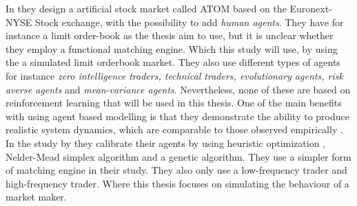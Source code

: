 \documentclass{kththesis}
\theoremstyle{definition}
\begin{document}
\newline
In \textcite{brandouy2011design} they design a artificial stock market called ATOM based on the Euronext-NYSE Stock exchange, with the possibility to add \textit{human agents}. They have for instance a limit order-book as the thesis aim to use, but it is unclear whether they employ a functional matching engine. Which this study will use, by using the a simulated limit orderbook market. They also use different types of agents for instance \textit{zero intelligence traders, technical traders, evolutionary agents, risk averse agents} and \textit{mean-variance agents}. 
\newline
\newline
Nevertheless, none of these are based on reinforcement learning that will be used in this thesis. One of the main benefits with using agent based modelling is that they demonstrate the ability to produce realistic system dynamics, which are comparable to those observed empirically \parencite{platt2016problem}. In the study by \textcite{platt2016problem} they calibrate their agents by using heuristic optimization , Nelder-Mead simplex algorithm and a genetic algorithm. They use a simpler form of matching engine in their study. They also only use a low-frequency trader and high-frequency trader. Where this thesis focuses on simulating the behaviour of a market maker.
\end{document}
